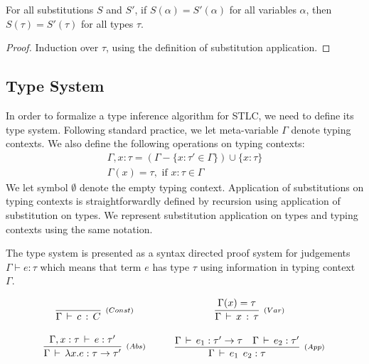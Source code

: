 \begin{Lemma}\label{extsubst}
For all substitutions $S$ and $S'$, if $S(\alpha)=S'(\alpha)$ for all
variables $\alpha$, then $S(\tau) = S'(\tau)$ for all types $\tau$.
\end{Lemma}
\begin{proof}
Induction over $\tau$, using the definition of substitution
application.
\end{proof}

\subsection{Type System}\label{type-system}

In order to formalize a type inference algorithm for STLC, we need to
define its type system. Following standard practice, we let
meta-variable $\Gamma$ denote typing contexts. We also define the
following operations on typing contexts:
\[
\begin{array}{l}
   \Gamma, x : \tau = (\Gamma - \{x : \tau' \in \Gamma\}) \cup \{x : \tau\}\\
   \Gamma(x) = \tau, \text{ if } x : \tau \in \Gamma
\end{array}
\]
We let symbol $\emptyset$ denote the empty typing context.
Application of substitutions on typing contexts is straightforwardly
defined by recursion using application of substitution on types. We
represent substitution application on types and typing contexts using
the same notation.

The type system is presented as a syntax directed proof system for judgements
$\Gamma \vdash e : \tau$ which means that term $e$ has type $\tau$
using information in typing context $\Gamma$.

\[
\begin{array}{ccc}
   \infer[_{(Const)}]
         {\Gamma\,\vdash\,c\,:\,C}
         {} &\:\:\:\: &
   \infer[_{(Var)}]
         {\Gamma\,\vdash\,x\,:\,\tau}
         {\Gamma(x) = \tau} \\ \\
   \infer[_{(Abs)}]
         {\Gamma\,\vdash\,\lambda x . e : \tau \to \tau'}
         {\Gamma, x : \tau\,\vdash\, e : \tau'} & &
   \infer[_{(App)}]
         {\Gamma\,\vdash\,e_1\:\:e_2 : \tau}
         {\Gamma\,\vdash\,e_1 : \tau' \to \tau &
          \Gamma\,\vdash\,e_2 : \tau'} \\
\end{array}
\]

